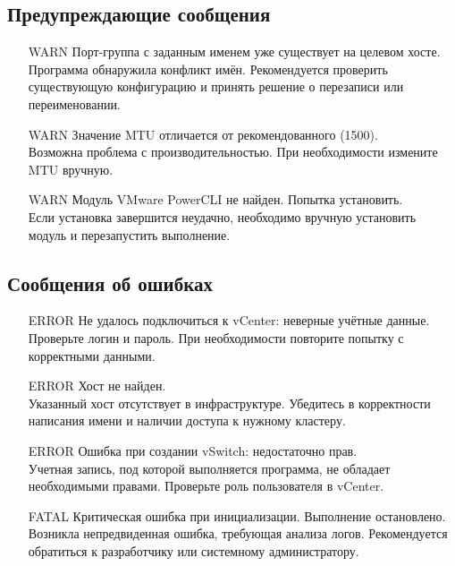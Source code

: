 \subsection{Предупреждающие сообщения}

\begin{itemize}
  \item [WARN] Порт-группа с заданным именем уже существует на целевом хосте.\\
  Программа обнаружила конфликт имён. Рекомендуется проверить существующую конфигурацию и принять решение о перезаписи или переименовании.

  \item [WARN] Значение MTU отличается от рекомендованного (1500).\\
  Возможна проблема с производительностью. При необходимости измените MTU вручную.

  \item [WARN] Модуль VMware PowerCLI не найден. Попытка установить.\\
  Если установка завершится неудачно, необходимо вручную установить модуль и перезапустить выполнение.
\end{itemize}

\subsection{Сообщения об ошибках}

\begin{itemize}
  \item [ERROR] Не удалось подключиться к vCenter: неверные учётные данные.\\
  Проверьте логин и пароль. При необходимости повторите попытку с корректными данными.

  \item [ERROR] Хост не найден.\\
  Указанный хост отсутствует в инфраструктуре. Убедитесь в корректности написания имени и наличии доступа к нужному кластеру.

  \item [ERROR] Ошибка при создании vSwitch: недостаточно прав.\\
  Учетная запись, под которой выполняется программа, не обладает необходимыми правами. Проверьте роль пользователя в vCenter.

  \item [FATAL] Критическая ошибка при инициализации. Выполнение остановлено.\\
  Возникла непредвиденная ошибка, требующая анализа логов. Рекомендуется обратиться к разработчику или системному администратору.
\end{itemize}

